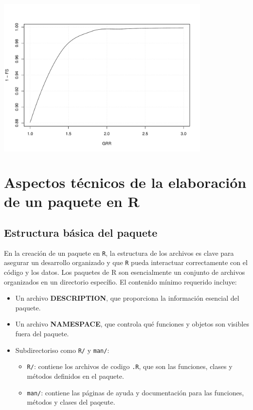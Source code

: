 \begin{center}
\includegraphics[width=0.8\textwidth]{figuras/codigo-optimshdfixed.pdf}
\end{center}


\section{Aspectos técnicos de la elaboración de un paquete en R}
\label{sec:orgfd7c4fc}
\label{sec:aspectos-tecnicos}
\subsection{Estructura básica del paquete}
\label{sec:orgd735576}
\label{subsec:estructura-paquete}
En la creación de un paquete en \texttt{R}, la estructura de los archivos es clave para asegurar un desarrollo organizado y que \texttt{R} pueda interactuar correctamente con el código y  los datos. Los paquetes de R son esencialmente un conjunto de archivos organizados en un directorio específio. El contenido mínimo requerido incluye:
\begin{itemize}
\item Un archivo \textbf{DESCRIPTION}, que proporciona la información esencial del paquete.
\item Un archivo \textbf{NAMESPACE}, que controla qué funciones y objetos son visibles fuera del paquete.
\item Subdirectoriso como \texttt{R/} y \texttt{man/}:
\begin{itemize}
\item \texttt{R/}: contiene los archivos de codigo \texttt{.R}, que son las funciones, clases y métodos definidos en el paquete.
\item \texttt{man/}: contiene las páginas de ayuda y documentación para las funciones, métodos y clases del paqeute.
\end{itemize}
\end{itemize}

